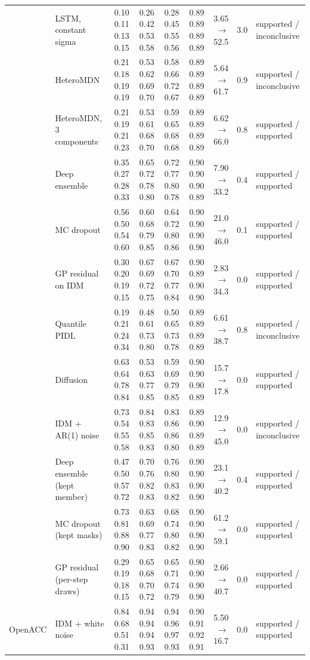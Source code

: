 \begin{longtable}{llrrrrrrl}
 & LSTM, constant sigma & 0.10 0.11 0.13 0.15 & 0.26 0.42 0.53 0.58 & 0.28 0.45 0.55 0.56 & 0.89 0.89 0.89 0.89 & 3.65 $\rightarrow$ 52.5 & 3.0 & supported / inconclusive \\
 & HeteroMDN & 0.21 0.18 0.19 0.19 & 0.53 0.62 0.69 0.70 & 0.58 0.66 0.72 0.67 & 0.89 0.89 0.89 0.89 & 5.64 $\rightarrow$ 61.7 & 0.9 & supported / inconclusive \\
 & HeteroMDN, 3 components & 0.21 0.19 0.21 0.23 & 0.53 0.61 0.68 0.70 & 0.59 0.65 0.68 0.68 & 0.89 0.89 0.89 0.89 & 6.62 $\rightarrow$ 66.0 & 0.8 & supported / supported \\
 & Deep ensemble & 0.35 0.27 0.28 0.33 & 0.65 0.72 0.78 0.80 & 0.72 0.77 0.80 0.78 & 0.90 0.90 0.90 0.89 & 7.90 $\rightarrow$ 33.2 & 0.4 & supported / supported \\
 & MC dropout & 0.56 0.50 0.54 0.60 & 0.60 0.68 0.79 0.85 & 0.64 0.72 0.80 0.86 & 0.90 0.90 0.90 0.90 & 21.0 $\rightarrow$ 46.0 & 0.1 & supported / supported \\
 & GP residual on IDM & 0.30 0.20 0.19 0.15 & 0.67 0.69 0.72 0.75 & 0.67 0.70 0.77 0.84 & 0.90 0.89 0.90 0.90 & 2.83 $\rightarrow$ 34.3 & 0.0 & supported / supported \\
 & Quantile PIDL & 0.19 0.21 0.24 0.34 & 0.48 0.61 0.73 0.80 & 0.50 0.65 0.73 0.78 & 0.89 0.89 0.89 0.89 & 6.61 $\rightarrow$ 38.7 & 0.8 & supported / inconclusive \\
 & Diffusion & 0.63 0.64 0.78 0.84 & 0.53 0.63 0.77 0.85 & 0.59 0.69 0.79 0.85 & 0.90 0.90 0.90 0.89 & 15.7 $\rightarrow$ 17.8 & 0.0 & supported / supported \\
 & IDM + AR(1) noise & 0.73 0.54 0.55 0.58 & 0.84 0.83 0.85 0.83 & 0.83 0.86 0.86 0.80 & 0.89 0.90 0.89 0.89 & 12.9 $\rightarrow$ 45.0 & 0.0 & supported / inconclusive \\
 & Deep ensemble (kept member) & 0.47 0.50 0.57 0.72 & 0.70 0.76 0.82 0.83 & 0.76 0.80 0.83 0.82 & 0.90 0.90 0.90 0.90 & 23.1 $\rightarrow$ 40.2 & 0.4 & supported / supported \\
 & MC dropout (kept masks) & 0.73 0.81 0.88 0.90 & 0.63 0.69 0.77 0.83 & 0.68 0.74 0.80 0.82 & 0.90 0.90 0.90 0.90 & 61.2 $\rightarrow$ 59.1 & 0.0 & supported / supported \\
 & GP residual (per-step draws) & 0.29 0.19 0.18 0.15 & 0.65 0.68 0.70 0.72 & 0.65 0.71 0.74 0.79 & 0.90 0.90 0.90 0.90 & 2.66 $\rightarrow$ 40.7 & 0.0 & supported / supported \\
\midrule
OpenACC & IDM + white noise & 0.84 0.68 0.51 0.31 & 0.94 0.94 0.94 0.93 & 0.94 0.96 0.97 0.93 & 0.90 0.91 0.92 0.91 & 5.50 $\rightarrow$ 16.7 & 0.0 & supported / supported \\

\end{longtable}
